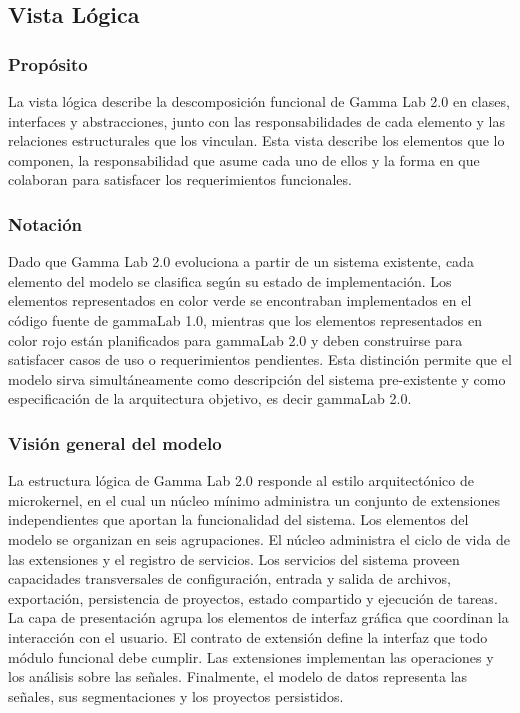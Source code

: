 \documentclass[11pt,a4paper]{article}
\DeclareRobustCommand{\_}{\textunderscore\allowbreak}
\begin{document}
\subsection{Vista Lógica}
\label{sec:vista_logica}

\subsubsection{Propósito}

La vista lógica describe la descomposición funcional de Gamma Lab 2.0 en clases, 
interfaces y abstracciones, junto con las responsabilidades de cada elemento y 
las relaciones estructurales que los vinculan. Esta vista describe los elementos que lo componen,
 la responsabilidad que asume cada uno de ellos y la forma en que colaboran para 
 satisfacer los requerimientos funcionales.

\subsubsection{Notación}

Dado que Gamma Lab 2.0 evoluciona a partir de un sistema existente, 
cada elemento del modelo se clasifica según su estado de implementación.
 Los elementos representados en color verde se encontraban implementados 
 en el código fuente de gammaLab 1.0, mientras que los elementos representados en
 color rojo están planificados para gammaLab 2.0 y deben construirse para satisfacer casos de 
 uso o requerimientos pendientes. Esta distinción permite que el modelo sirva 
 simultáneamente como descripción del sistema pre-existente y como especificación de 
 la arquitectura objetivo, es decir gammaLab 2.0.

\subsubsection{Visión general del modelo}

La estructura lógica de Gamma Lab 2.0 responde al estilo arquitectónico de microkernel,
 en el cual un núcleo mínimo administra un conjunto de extensiones independientes que 
 aportan la funcionalidad del sistema. Los elementos del modelo se organizan en seis 
 agrupaciones. El núcleo administra el ciclo de vida de las extensiones y el registro
  de servicios. Los servicios del sistema proveen capacidades transversales de configuración,
   entrada y salida de archivos, exportación, persistencia de proyectos, estado compartido y 
   ejecución de tareas. La capa de presentación agrupa los elementos de interfaz gráfica que 
   coordinan la interacción con el usuario. El contrato de extensión define la interfaz que 
   todo módulo funcional debe cumplir. Las extensiones implementan las operaciones y los 
   análisis sobre las señales. Finalmente, el modelo de datos representa las señales,
    sus segmentaciones y los proyectos persistidos. 
    
\end{document}
